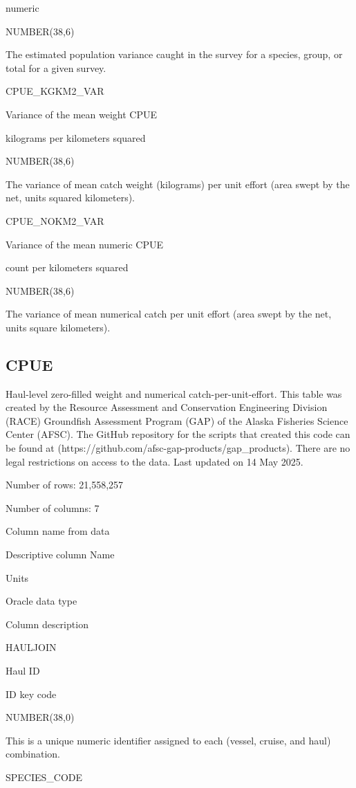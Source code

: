 \documentclass[
  letterpaper,
  oneside,
  open=any]{scrbook}
\begin{document}
numeric

NUMBER(38,6)

The estimated population variance caught in the survey for a species,
group, or total for a given survey.

CPUE\_KGKM2\_VAR

Variance of the mean weight CPUE

kilograms per kilometers squared

NUMBER(38,6)

The variance of mean catch weight (kilograms) per unit effort (area
swept by the net, units squared kilometers).

CPUE\_NOKM2\_VAR

Variance of the mean numeric CPUE

count per kilometers squared

NUMBER(38,6)

The variance of mean numerical catch per unit effort (area swept by the
net, units square kilometers).

\subsection{CPUE}\label{cpue}

Haul-level zero-filled weight and numerical catch-per-unit-effort. This
table was created by the Resource Assessment and Conservation
Engineering Division (RACE) Groundfish Assessment Program (GAP) of the
Alaska Fisheries Science Center (AFSC). The GitHub repository for the
scripts that created this code can be found at
(https://github.com/afsc-gap-products/gap\_products). There are no legal
restrictions on access to the data. Last updated on 14 May 2025.

Number of rows: 21,558,257

Number of columns: 7

Column name from data

Descriptive column Name

Units

Oracle data type

Column description

HAULJOIN

Haul ID

ID key code

NUMBER(38,0)

This is a unique numeric identifier assigned to each (vessel, cruise,
and haul) combination.

SPECIES\_CODE
\end{document}
